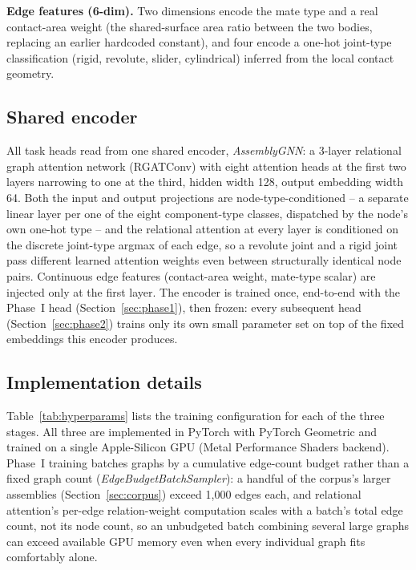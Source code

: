 \documentclass[sn-mathphys,Numbered]{sn-jnl}
\begin{document}
\textbf{Edge features (6-dim).} Two dimensions encode the mate type and a real contact-area weight (the shared-surface area ratio between the two bodies, replacing an earlier hardcoded constant), and four encode a one-hot joint-type classification (rigid, revolute, slider, cylindrical) inferred from the local contact geometry.

\subsection{Shared encoder}\label{sec:encoder}

All task heads read from one shared encoder, \textit{AssemblyGNN}: a 3-layer relational graph attention network (RGATConv) with eight attention heads at the first two layers narrowing to one at the third, hidden width 128, output embedding width 64. Both the input and output projections are node-type-conditioned -- a separate linear layer per one of the eight component-type classes, dispatched by the node's own one-hot type -- and the relational attention at every layer is conditioned on the discrete joint-type argmax of each edge, so a revolute joint and a rigid joint pass different learned attention weights even between structurally identical node pairs. Continuous edge features (contact-area weight, mate-type scalar) are injected only at the first layer. The encoder is trained once, end-to-end with the Phase~I head (Section~\ref{sec:phase1}), then frozen: every subsequent head (Section~\ref{sec:phase2}) trains only its own small parameter set on top of the fixed embeddings this encoder produces.

\subsection{Implementation details}\label{sec:implementation}

Table~\ref{tab:hyperparams} lists the training configuration for each of the three stages. All three are implemented in PyTorch with PyTorch Geometric \cite{fey2019pyg} and trained on a single Apple-Silicon GPU (Metal Performance Shaders backend). Phase~I training batches graphs by a cumulative edge-count budget rather than a fixed graph count (\textit{EdgeBudgetBatchSampler}): a handful of the corpus's larger assemblies (Section~\ref{sec:corpus}) exceed 1{,}000 edges each, and relational attention's per-edge relation-weight computation scales with a batch's total edge count, not its node count, so an unbudgeted batch combining several large graphs can exceed available GPU memory even when every individual graph fits comfortably alone.
\end{document}
